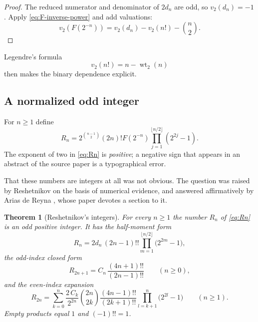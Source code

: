 \documentclass[11pt,oneside]{article}
\newtheorem{theorem}{Theorem}[section]
\theoremstyle{definition}
\theoremstyle{remark}
\newcommand{\wt}{\operatorname{wt}_2}
\newcommand{\vtwo}{v_2}
\begin{document}
\begin{proof}
The reduced numerator and denominator of $2d_n$ are odd, so $\vtwo(d_n)=-1$.  Apply
\eqref{eq:F-inverse-power} and add valuations:
\begin{equation*}
 \vtwo(F(2^{-n}))=\vtwo(d_n)-\vtwo(n!)-\binom n2.
\end{equation*}
\end{proof}

Legendre's formula
\begin{equation}
 \vtwo(n!)=n-\wt(n)                                       \label{eq:legendre-v2}
\end{equation}
then makes the binary dependence explicit.

\subsection{A normalized odd integer}

For $n\ge1$ define
\begin{equation}
 R_n=
 2^{\binom{n-1}{2}}(2n)!F(2^{-n})
 \prod_{j=1}^{\lfloor n/2\rfloor}(2^{2j}-1).              \label{eq:Rn}
\end{equation}
The exponent of two in \eqref{eq:Rn} is \emph{positive}; a negative sign that appears in an
abstract of the source paper is a typographical error.

That these numbers are integers at all was not obvious.  The question was raised by
Reshetnikov \cite{reshetnikovMO} on the basis of numerical evidence, and answered
affirmatively by Arias de Reyna \cite{arias2018}, whose paper devotes a section to it.

\begin{theorem}[Reshetnikov's integers]                     \label{thm:mom-reshetnikov}
For every $n\ge1$ the number $R_n$ of \eqref{eq:Rn} is an odd positive integer.  It has the
half-moment form
\begin{equation}
 R_n=2d_n\,(2n-1)!!\prod_{m=1}^{\lfloor n/2\rfloor}\bigl(2^{2m}-1\bigr),
                                                           \label{eq:mom-Rn-dn}
\end{equation}
the odd-index closed form
\begin{equation}
 R_{2n+1}=C_n\,\frac{(4n+1)!!}{(2n-1)!!}\qquad(n\ge0),      \label{eq:mom-Rn-odd}
\end{equation}
and the even-index expansion
\begin{equation}
 R_{2n}=\sum_{k=0}^{n}\frac{2\,C_k}{2^{2n}}\binom{2n}{2k}
 \frac{(4n-1)!!}{(2k+1)!!}\prod_{l=k+1}^{n}\bigl(2^{2l}-1\bigr)
 \qquad(n\ge1).                                            \label{eq:mom-Rn-even}
\end{equation}
Empty products equal $1$ and $(-1)!!=1$.
\end{theorem}
\end{document}
